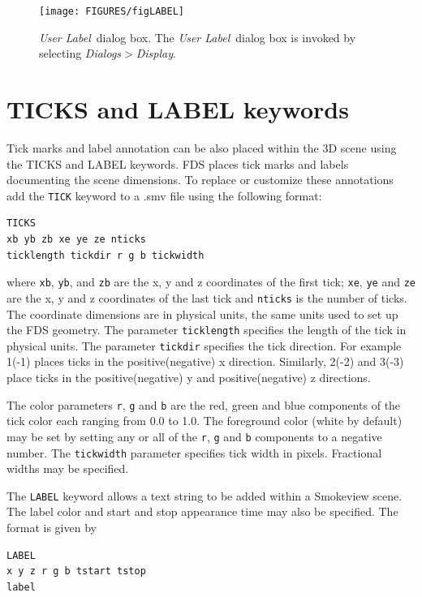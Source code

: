 \documentclass[11pt,twoside]{book}
\begin{document}
\begin{figure}[\figoptions]
\centerline{
\texttt{[image: FIGURES/figLABEL]}
} \caption[{\em User Label}\ dialog box.]{{\em User Label}\ dialog
box. The {\em User Label}\ dialog box is invoked by selecting {\em
Dialogs$>$Display}. } \label{figLABELdialog}
\end{figure}



\section{TICKS and LABEL keywords}
Tick marks and label annotation
can be also placed within the 3D scene using the TICKS and LABEL keywords.
FDS places tick marks and labels
documenting the scene dimensions.  To replace or customize
these annotations add the {\tt TICK} keyword to a .smv file
using the following format:

\begin{lstlisting}
TICKS
xb yb zb xe ye ze nticks
ticklength tickdir r g b tickwidth
\end{lstlisting}

\noindent where {\tt xb}, {\tt yb}, and {\tt zb} are the x, y and
z coordinates of the first tick; {\tt xe}, {\tt ye} and {\tt ze}
are the x, y and z coordinates of the last tick and {\tt nticks}
is the number of ticks. The coordinate dimensions are in physical
units, the same units used to set up the FDS geometry. The
parameter {\tt ticklength} specifies the length of the tick in
physical units. The parameter {\tt tickdir} specifies the tick
direction.  For example 1(-1) places ticks in the
positive(negative) x direction. Similarly, 2(-2) and 3(-3) place
ticks in the positive(negative) y and positive(negative) z
directions.

The color parameters {\tt r}, {\tt g} and {\tt b} are the
red, green and blue components of the tick color each
ranging from 0.0 to 1.0. The foreground color (white by
default) may be set by setting any or all of the {\tt r},
{\tt g} and {\tt b} components to a negative number. The
{\tt tickwidth} parameter specifies tick width in pixels.
Fractional widths may be specified.

The {\tt LABEL} keyword allows a text string to be added
within a Smokeview scene.  The label color and start and
stop appearance time may also be specified. The format is
given by

\begin{lstlisting}
LABEL
x y z r g b tstart tstop
label
\end{lstlisting}
\end{document}
